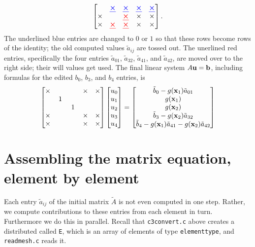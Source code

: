 \begin{example}
\begin{equation*}
\begin{bmatrix}
   & {\color{blue} \bm{\underline{\times}}} & {\color{blue} \bm{\underline{\times}}} & {\color{blue} \bm{\underline{\times}}} & {\color{blue} \bm{\underline{\times}}} \\
\times &    & {\color{red} \bm{\underline{\times}}} & \times & \times \\
\times & {\color{red} \bm{\underline{\times}}} & {\color{red} \bm{\underline{\times}}} & \times & \times
\end{bmatrix}.
\end{equation*}
The underlined {\color{blue} blue} entries are changed to $0$ or $1$ so that these rows become rows of the identity; the old computed values $\tilde a_{ij}$ are tossed out.  The unerlined {\color{red} red} entries, specifically the four entries $\tilde a_{01}$, $\tilde a_{32}$, $\tilde a_{41}$, and $\tilde a_{42}$, are moved over to the right side; their will values get used.  The final linear system $A \mathbf{u} = \mathbf{b}$, including formulas for the edited $b_0$, $b_3$, and $b_4$ entries, is
\begin{equation*}
\begin{bmatrix}
\times & & & \times & \times \\
 & \,1\, & & & \\
 & & \,1\, & & \\
\times & & & \times & \times \\
\times & & & \times & \times
\end{bmatrix}
\begin{bmatrix}
u_0 \\
u_1 \\
u_2 \\
u_3 \\
u_4
\end{bmatrix}
=
\begin{bmatrix}
\tilde b_0 - g(\mathbf{x}_1) \tilde a_{01} \\
g(\mathbf{x}_1) \\
g(\mathbf{x}_2) \\
\tilde b_3 - g(\mathbf{x}_2) \tilde a_{32} \\
\tilde b_4 - g(\mathbf{x}_1) \tilde a_{41} - g(\mathbf{x}_2) \tilde a_{42}
\end{bmatrix}
\end{equation*}
\end{example}
\noindent\hrulefill

\bigskip


\section{Assembling the matrix equation, element by element}

Each entry $\tilde a_{ij}$ of the initial matrix $\tilde A$ is not even computed in one step.  Rather, we compute contributions to these entries from each element in turn.  Furthermore we do this in parallel.  Recall that \texttt{c3convert.c} above creates a distributed \pVec called \texttt{E}, which is an array of elements of type \texttt{elementtype}, and \texttt{readmesh.c} reads it.

